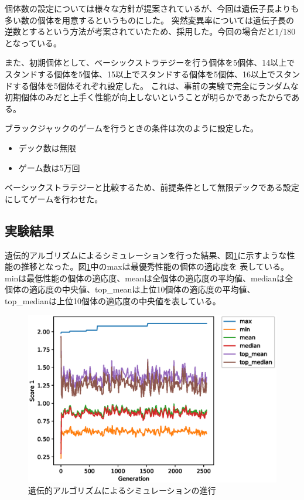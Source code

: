 個体数の設定については様々な方針が提案されているが、今回は遺伝子長よりも多い数の個体を用意するというものにした。
突然変異率については遺伝子長の逆数とするという方法が考案されていたため、採用した。今回の場合だと$1/180$となっている。

また、初期個体として、ベーシックストラテジーを行う個体を5個体、14以上でスタンドする個体を5個体、15以上でスタンドする個体を5個体、16以上でスタンドする個体を5個体それぞれ設定した。
これは、事前の実験で完全にランダムな初期個体のみだと上手く性能が向上しないということが明らかであったからである。

ブラックジャックのゲームを行うときの条件は次のように設定した。

\begin{itemize}
\item デック数は無限
\item ゲーム数は5万回
\end{itemize}

ベーシックストラテジーと比較するため、前提条件として無限デックである設定にしてゲームを行わせた。

\subsection{実験結果}
遺伝的アルゴリズムによるシミュレーションを行った結果、図\ref{gaprocess}に示すような性能の推移となった。図\ref{gaprocess}中のmaxは最優秀性能の個体の適応度を
表している。minは最低性能の個体の適応度、meanは全個体の適応度の平均値、medianは全個体の適応度の中央値、top\_meanは上位10個体の適応度の平均値、
top\_medianは上位10個体の適応度の中央値を表している。

  \begin{figure}[htbp]
    \includegraphics[width=14.0cm]{figure/gaprocess.eps}
    \caption{遺伝的アルゴリズムによるシミュレーションの進行}
    \label{gaprocess}
  \end{figure}

